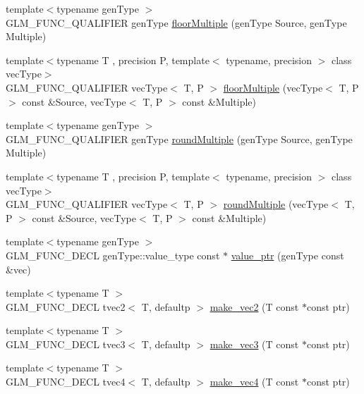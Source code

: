 \begin{DoxyCompactItemize}
\item 
{\footnotesize template$<$typename gen\+Type $>$ }\\G\+L\+M\+\_\+\+F\+U\+N\+C\+\_\+\+Q\+U\+A\+L\+I\+F\+I\+E\+R gen\+Type \hyperlink{group__gtc__round_ga9eafb9dbedf84e5cece65c2fe9d5631d}{floor\+Multiple} (gen\+Type Source, gen\+Type Multiple)
\item 
{\footnotesize template$<$typename T , precision P, template$<$ typename, precision $>$ class vec\+Type$>$ }\\G\+L\+M\+\_\+\+F\+U\+N\+C\+\_\+\+Q\+U\+A\+L\+I\+F\+I\+E\+R vec\+Type$<$ T, P $>$ \hyperlink{group__gtc__round_ga6912db42d43873fe1dedb3aed2b7a239}{floor\+Multiple} (vec\+Type$<$ T, P $>$ const \&Source, vec\+Type$<$ T, P $>$ const \&Multiple)
\item 
{\footnotesize template$<$typename gen\+Type $>$ }\\G\+L\+M\+\_\+\+F\+U\+N\+C\+\_\+\+Q\+U\+A\+L\+I\+F\+I\+E\+R gen\+Type \hyperlink{group__gtc__round_ga6739d1de04b2cea7c78675b365644bce}{round\+Multiple} (gen\+Type Source, gen\+Type Multiple)
\item 
{\footnotesize template$<$typename T , precision P, template$<$ typename, precision $>$ class vec\+Type$>$ }\\G\+L\+M\+\_\+\+F\+U\+N\+C\+\_\+\+Q\+U\+A\+L\+I\+F\+I\+E\+R vec\+Type$<$ T, P $>$ \hyperlink{group__gtc__round_ga10a8ab7b254257b607b6a3fc68c3e661}{round\+Multiple} (vec\+Type$<$ T, P $>$ const \&Source, vec\+Type$<$ T, P $>$ const \&Multiple)
\item 
{\footnotesize template$<$typename gen\+Type $>$ }\\G\+L\+M\+\_\+\+F\+U\+N\+C\+\_\+\+D\+E\+C\+L gen\+Type\+::value\+\_\+type const $\ast$ \hyperlink{group__gtc__type__ptr_gaf019636bb8bd7c9efb7c7ce3bb23bcfc}{value\+\_\+ptr} (gen\+Type const \&vec)
\item 
{\footnotesize template$<$typename T $>$ }\\G\+L\+M\+\_\+\+F\+U\+N\+C\+\_\+\+D\+E\+C\+L tvec2$<$ T, defaultp $>$ \hyperlink{group__gtc__type__ptr_ga5f7393c30970c5949be13ceb525093a6}{make\+\_\+vec2} (T const $\ast$const ptr)
\item 
{\footnotesize template$<$typename T $>$ }\\G\+L\+M\+\_\+\+F\+U\+N\+C\+\_\+\+D\+E\+C\+L tvec3$<$ T, defaultp $>$ \hyperlink{group__gtc__type__ptr_ga86f4bc63570db86346db2e567fb760f6}{make\+\_\+vec3} (T const $\ast$const ptr)
\item 
{\footnotesize template$<$typename T $>$ }\\G\+L\+M\+\_\+\+F\+U\+N\+C\+\_\+\+D\+E\+C\+L tvec4$<$ T, defaultp $>$ \hyperlink{group__gtc__type__ptr_ga152345176b8951c15711f6ed4f6fc237}{make\+\_\+vec4} (T const $\ast$const ptr)

\end{DoxyCompactItemize}
